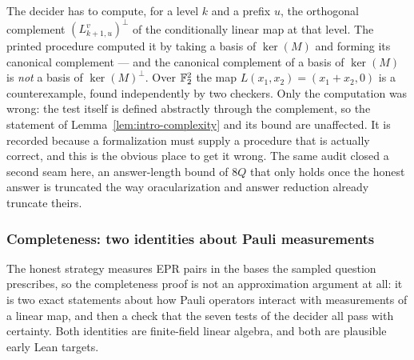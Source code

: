 \begin{remark}
\label{rem:intro-lperp}
The decider has to compute, for a level $k$ and a prefix $u$, the orthogonal complement
$(L^v_{k+1, u})^\perp$ of the conditionally linear map at that level. The printed procedure
computed it by taking a basis of $\ker(M)$ and forming its canonical complement --- and the
canonical complement of a basis of $\ker(M)$ is \emph{not} a basis of $\ker(M)^\perp$. Over
$\mathbb{F}_2^2$ the map $L(x_1, x_2) = (x_1 + x_2, 0)$ is a counterexample, found independently by
two checkers. Only the computation was wrong: the test itself is defined abstractly through
the complement, so the statement of Lemma~\ref{lem:intro-complexity} and its bound are
unaffected. It is recorded because a formalization must supply a procedure that is actually
correct, and this is the obvious place to get it wrong. The same audit closed a second seam
here, an answer-length bound of $8Q$ that only holds once the honest answer is truncated the
way oracularization and answer reduction already truncate theirs.
\end{remark}

\subsubsection{Completeness: two identities about Pauli measurements}

The honest strategy measures EPR pairs in the bases the sampled question prescribes, so the
completeness proof is not an approximation argument at all: it is two exact statements about
how Pauli operators interact with measurements of a linear map, and then a check that the
seven tests of the decider all pass with certainty. Both identities are finite-field linear
algebra, and both are plausible early Lean targets.

\effortMedium

